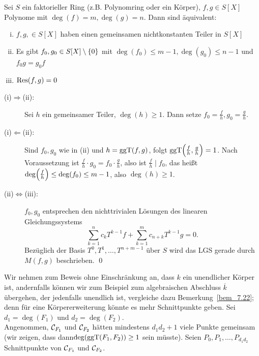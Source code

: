 \begin{satz}
\label{satz_10.8}
	Sei $S$ ein faktorieller Ring (z.B. Polynomring oder ein Körper), $f,g \in S[X]$ Polynome mit $\deg(f)=m, \deg(g)=n$. Dann sind äquivalent: \begin{enumerate}[(i)]
		\item $f,g, \in S[X]$ haben einen gemeinsamen nichtkonstanten Teiler in $S[X]$
		\item Es gibt $f_0,g_0 \in S[X] \setminus \{0\}$ mit $\deg(f_0) \leq m-1, \deg(g_0) \leq n-1$ und $f_0 g= g_0 f$
		\item $\operatorname{Res}(f,g) = 0$
	\end{enumerate}
\end{satz}

	\begin{description}
		\item[(i)$\Rightarrow$(ii):] Sei $h$ ein gemeinsamer Teiler, $\deg(h) \geq 1$. Dann setze $f_0 = \frac{f}{h}, g_0 = \frac{g}{h}$.
		\item[(i)$\Leftarrow$(ii):] Sind $f_0,g_0$ wie in (ii) und $h = \operatorname{ggT}(f,g)$, folgt $\ggT\enbrace*{\frac{f}{h},\frac{g}{h}}=1$. Nach Voraussetzung ist $\frac{f}{h} \cdot g_0 = f_0 \cdot \frac{g}{h}$, also ist $\frac{f}{h} \mid f_0$, das heißt $\deg\enbrace*{\frac{f}{h}} \leq \deg(f_0) \leq m-1$, also $\deg(h) \geq 1$.
		\item[(ii)$\Leftrightarrow$(iii):] $f_0, g_0$ entsprechen den nichttrivialen Lösungen des linearen Gleichungssystems
		\[ \sum_{k=1}^{n} c_k T^{k-1} f + \sum_{k=1}^m c_{n+k} T^{k-1} g = 0. \]
		Bezüglich der Basis $T^0, T^1, \dots, T^{n+m-1}$ über $S$ wird das LGS gerade durch $M(f,g)$ beschrieben. \qed
	\end{description}
	
\begin{bew}
	Wir nehmen zum Beweis ohne Einschränkung an, dass $k$ ein unendlicher Körper ist, andernfalls können wir zum Beispiel zum algebraischen Abschluss $\overline{k}$ übergehen, der jedenfalls unendlich ist, vergleiche dazu Bemerkung~\ref{bem_7.22}; denn für eine Körpererweiterung könnte es mehr Schnittpunkte geben. Sei $d_1 = \deg(F_1)$ und $d_2 = \deg(F_2)$. \\
	Angenommen, $\mathcal{C}_{F_1}$ und $\mathcal{C}_{F_2}$ hätten mindestens $d_1 d_2+1$ viele Punkte gemeinsam (wir zeigen, dass dann\linebreak $\deg(\operatorname{ggT}(F_1,F_2)) \geq 1$ sein müsste). Seien $P_0, P_1, \dots, P_{d_1d_2}$ Schnittpunkte von $\mathcal{C}_{F_1}$ und $\mathcal{C}_{F_2}$.
\end{bew}


